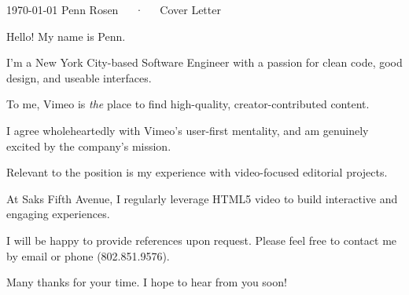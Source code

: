 \documentclass[12pt, letterpaper]{awesome-cv}
\newcommand{\companyname}{Vimeo}
\begin{document}
\makecvheader[R]

\makecvfooter
  {\today}
  {Penn Rosen~~~·~~~Cover Letter}
  {}

\makelettertitle

\begin{cvletter}

Hello! My name is Penn.

I'm a New York City-based Software Engineer with a passion for clean code, good design, and useable interfaces.


To me, \companyname{} is \textit{the} place to find high-quality, creator-contributed content. 

I agree wholeheartedly with \companyname's user-first mentality, and am genuinely excited by the company's mission. 



Relevant to the position is my experience with video-focused editorial projects. 

At Saks Fifth Avenue, I regularly leverage HTML5 video to build interactive and engaging experiences. 



I will be happy to provide references upon request. Please feel free to contact me by email or phone (802.851.9576).

Many thanks for your time. I hope to hear from you soon! 

\end{cvletter}


\makeletterclosing
\end{document}
